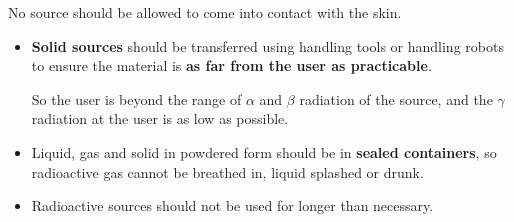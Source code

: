 No source should be allowed to come into contact with the skin.
\begin{itemize}
    \item \textbf{Solid sources} should be transferred using handling tools or handling robots to ensure the material is \textbf{as far from the user as practicable}.

        So the user is beyond the range of $\alpha$ and $\beta$ radiation of the source, and the $\gamma$ radiation at the user is as low as possible.
    \item Liquid, gas and solid in powdered form should be in \textbf{sealed containers}, so radioactive gas cannot be breathed in, liquid splashed or drunk.
    \item Radioactive sources should not be used for longer than necessary.
\end{itemize}
